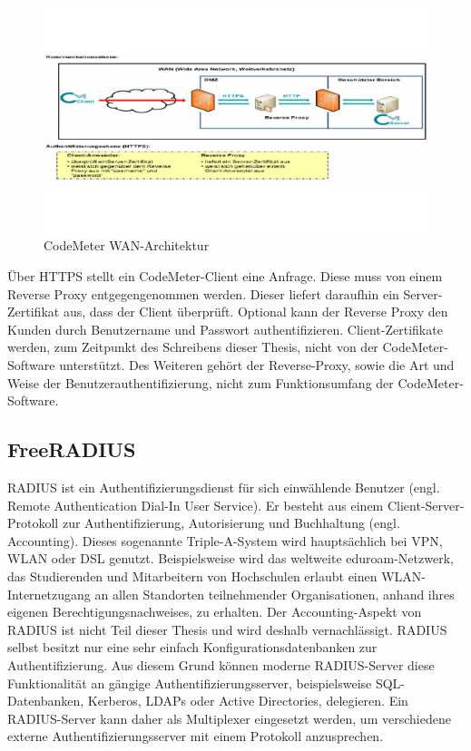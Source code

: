 \documentclass[11pt,a4paper]{report}
\begin{document}
\begin{figure}[htbp]
\centering
\includegraphics[scale=1.2]{images/codemeter_wan.pdf}
\caption{CodeMeter WAN-Architektur}
\label{fig:radius_access}
\end{figure}

Über HTTPS stellt ein CodeMeter-Client eine Anfrage. Diese muss von einem Reverse Proxy entgegengenommen werden. Dieser liefert daraufhin ein Server-Zertifikat aus, dass der Client überprüft. Optional kann der Reverse Proxy den Kunden durch Benutzername und Passwort authentifizieren. Client-Zertifikate werden, zum Zeitpunkt des Schreibens dieser Thesis, nicht von der CodeMeter-Software unterstützt. Des Weiteren gehört der Reverse-Proxy, sowie die Art und Weise der Benutzerauthentifizierung, nicht zum Funktionsumfang der CodeMeter-Software. 

\subsection{FreeRADIUS}

RADIUS ist ein Authentifizierungsdienst für sich einwählende Benutzer (engl. Remote Authentication Dial-In User Service). Er besteht aus einem Client-Server-Protokoll zur Authentifizierung, Autorisierung und Buchhaltung (engl. Accounting). Dieses sogenannte Triple-A-System wird hauptsächlich bei VPN, WLAN oder DSL genutzt. Beispielsweise wird das weltweite eduroam-Netzwerk, das Studierenden und Mitarbeitern von Hochschulen erlaubt einen WLAN-Internetzugang an allen Standorten teilnehmender Organisationen, anhand ihres eigenen Berechtigungsnachweises, zu erhalten. Der Accounting-Aspekt von RADIUS ist nicht Teil dieser Thesis und wird deshalb vernachlässigt. RADIUS selbst besitzt nur eine sehr einfach Konfigurationsdatenbanken zur Authentifizierung. Aus diesem Grund können moderne RADIUS-Server diese Funktionalität an gängige Authentifizierungsserver, beispielsweise SQL-Datenbanken, Kerberos, LDAPs oder Active Directories, delegieren. Ein RADIUS-Server kann daher als Multiplexer eingesetzt werden, um verschiedene externe Authentifizierungsserver mit einem Protokoll anzusprechen.
\end{document}
